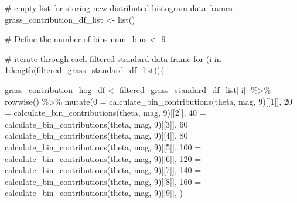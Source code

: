 \documentclass[
  letterpaper,
  DIV=11,
  numbers=noendperiod]{scrreprt}
\newenvironment{Shaded}{\begin{snugshade}}{\end{snugshade}}
\newcommand{\AttributeTok}[1]{\textcolor[rgb]{0.40,0.45,0.13}{#1}}
\newcommand{\CommentTok}[1]{\textcolor[rgb]{0.37,0.37,0.37}{#1}}
\newcommand{\ControlFlowTok}[1]{\textcolor[rgb]{0.00,0.23,0.31}{#1}}
\newcommand{\DecValTok}[1]{\textcolor[rgb]{0.68,0.00,0.00}{#1}}
\newcommand{\FunctionTok}[1]{\textcolor[rgb]{0.28,0.35,0.67}{#1}}
\newcommand{\NormalTok}[1]{\textcolor[rgb]{0.00,0.23,0.31}{#1}}
\newcommand{\OtherTok}[1]{\textcolor[rgb]{0.00,0.23,0.31}{#1}}
\newcommand{\SpecialCharTok}[1]{\textcolor[rgb]{0.37,0.37,0.37}{#1}}
\newcommand{\StringTok}[1]{\textcolor[rgb]{0.13,0.47,0.30}{#1}}
\begin{document}
\begin{Shaded}
\begin{Highlighting}[]
\CommentTok{\# empty list for storing new distributed histogram data frames}
\NormalTok{grass\_contribution\_df\_list }\OtherTok{\textless{}{-}} \FunctionTok{list}\NormalTok{()}

\CommentTok{\# Define the number of bins}
\NormalTok{num\_bins }\OtherTok{\textless{}{-}} \DecValTok{9}

\CommentTok{\# iterate through each filtered standard data frame}
\ControlFlowTok{for}\NormalTok{ (i }\ControlFlowTok{in} \DecValTok{1}\SpecialCharTok{:}\FunctionTok{length}\NormalTok{(filtered\_grass\_standard\_df\_list))\{}
  
\NormalTok{  grass\_contribution\_hog\_df }\OtherTok{\textless{}{-}} 
\NormalTok{    filtered\_grass\_standard\_df\_list[[i]] }\SpecialCharTok{\%\textgreater{}\%}
    \FunctionTok{rowwise}\NormalTok{() }\SpecialCharTok{\%\textgreater{}\%}
    \FunctionTok{mutate}\NormalTok{(}\StringTok{\textasciigrave{}}\AttributeTok{0}\StringTok{\textasciigrave{}} \OtherTok{=} \FunctionTok{calculate\_bin\_contributions}\NormalTok{(theta, mag, }\DecValTok{9}\NormalTok{)[[}\DecValTok{1}\NormalTok{]],}
           \StringTok{\textasciigrave{}}\AttributeTok{20}\StringTok{\textasciigrave{}} \OtherTok{=} \FunctionTok{calculate\_bin\_contributions}\NormalTok{(theta, mag, }\DecValTok{9}\NormalTok{)[[}\DecValTok{2}\NormalTok{]],}
           \StringTok{\textasciigrave{}}\AttributeTok{40}\StringTok{\textasciigrave{}} \OtherTok{=} \FunctionTok{calculate\_bin\_contributions}\NormalTok{(theta, mag, }\DecValTok{9}\NormalTok{)[[}\DecValTok{3}\NormalTok{]],}
           \StringTok{\textasciigrave{}}\AttributeTok{60}\StringTok{\textasciigrave{}} \OtherTok{=} \FunctionTok{calculate\_bin\_contributions}\NormalTok{(theta, mag, }\DecValTok{9}\NormalTok{)[[}\DecValTok{4}\NormalTok{]],}
           \StringTok{\textasciigrave{}}\AttributeTok{80}\StringTok{\textasciigrave{}} \OtherTok{=} \FunctionTok{calculate\_bin\_contributions}\NormalTok{(theta, mag, }\DecValTok{9}\NormalTok{)[[}\DecValTok{5}\NormalTok{]],}
           \StringTok{\textasciigrave{}}\AttributeTok{100}\StringTok{\textasciigrave{}} \OtherTok{=} \FunctionTok{calculate\_bin\_contributions}\NormalTok{(theta, mag, }\DecValTok{9}\NormalTok{)[[}\DecValTok{6}\NormalTok{]],}
           \StringTok{\textasciigrave{}}\AttributeTok{120}\StringTok{\textasciigrave{}} \OtherTok{=} \FunctionTok{calculate\_bin\_contributions}\NormalTok{(theta, mag, }\DecValTok{9}\NormalTok{)[[}\DecValTok{7}\NormalTok{]],}
           \StringTok{\textasciigrave{}}\AttributeTok{140}\StringTok{\textasciigrave{}} \OtherTok{=} \FunctionTok{calculate\_bin\_contributions}\NormalTok{(theta, mag, }\DecValTok{9}\NormalTok{)[[}\DecValTok{8}\NormalTok{]],}
           \StringTok{\textasciigrave{}}\AttributeTok{160}\StringTok{\textasciigrave{}} \OtherTok{=} \FunctionTok{calculate\_bin\_contributions}\NormalTok{(theta, mag, }\DecValTok{9}\NormalTok{)[[}\DecValTok{9}\NormalTok{]],}
\NormalTok{           )}
  

\end{Highlighting}
\end{Shaded}
\end{document}
